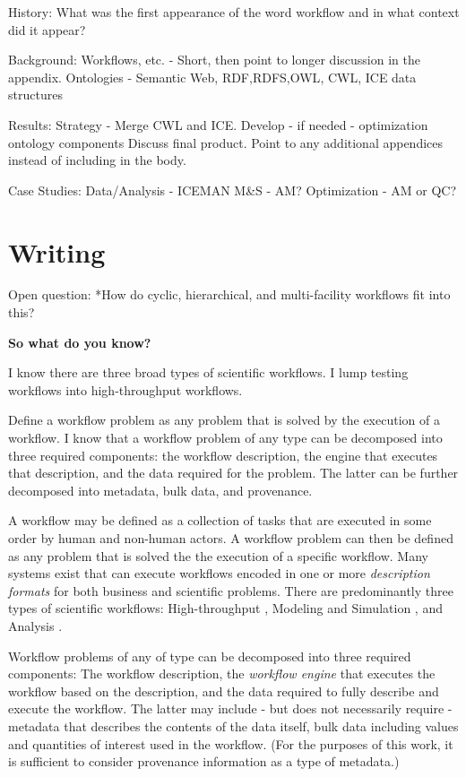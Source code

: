 History:
What was the first appearance of the word workflow and in what context did it
appear?

Background:
Workflows, etc. - Short, then point to longer discussion in the appendix.
Ontologies - Semantic Web, {RDF,RDFS,OWL}, CWL, ICE data structures

Results:
Strategy - Merge CWL and ICE. Develop - if needed - optimization ontology components
Discuss final product. Point to any additional appendices instead of including in the body.

Case Studies:
Data/Analysis - ICEMAN
M\&S - AM?
Optimization - AM or QC?

\section{Writing}

Open question:
*How do cyclic, hierarchical, and multi-facility workflows fit into this?

\textbf{So what do you know?}

I know there are three broad types of scientific workflows. I lump testing
workflows into high-throughput workflows.

Define a workflow problem as any problem that is solved by the execution of a
workflow. I know that a workflow problem of any type can be decomposed into
three required components: the workflow description, the engine that executes
that description, and the data required for the problem. The latter can be
further decomposed into metadata, bulk data, and provenance.

A workflow may be defined as a collection of tasks that are executed in some
order by human and non-human actors. A workflow problem can then be defined as
any problem that is solved the the execution of a specific workflow. Many
systems exist that can execute workflows encoded in one or more
\textit{description formats} for both business and scientific problems. There
are predominantly three types of scientific workflows: High-throughput \cite{},
Modeling and Simulation \cite{}, and Analysis \cite{}.

Workflow problems of any of type can be decomposed into three required
components: The workflow description, the \textit{workflow engine} that
executes the workflow based on the description, and the data required to fully
describe and execute the workflow. The latter may include - but does not
necessarily require - metadata that describes the contents of the data itself,
bulk data including values and quantities of interest used in the workflow.
(For the purposes of this work, it is sufficient to consider provenance
information as a type of metadata.)
